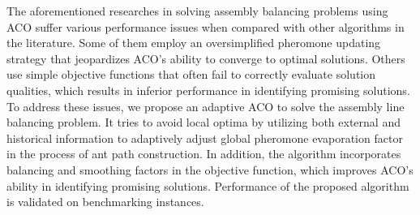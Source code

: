The aforementioned researches in solving assembly balancing problems using ACO suffer various performance issues when compared with other algorithms in the literature.
Some of them employ an oversimplified pheromone updating strategy that jeopardizes ACO's ability to converge to optimal solutions. 
Others use simple objective functions that often fail to correctly evaluate solution qualities, which results in inferior performance in identifying promising solutions.
To address these issues, we propose an adaptive ACO to solve the assembly line balancing problem.
It tries to avoid local optima by utilizing both external and historical information to adaptively adjust global pheromone evaporation factor in the process of ant path construction.
In addition, the algorithm incorporates balancing and smoothing factors in the objective function, which improves ACO's ability in identifying promising solutions.
Performance of the proposed algorithm is validated on benchmarking instances.
